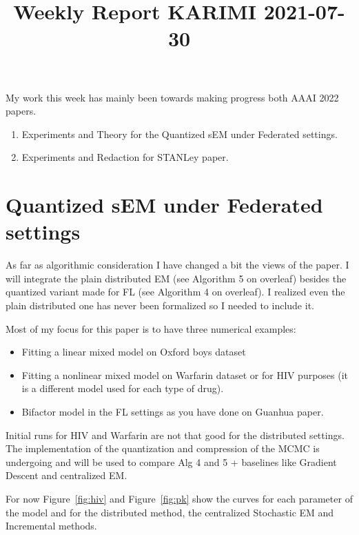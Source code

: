 \documentclass{article}
\begin{document}
\title{Weekly Report KARIMI 2021-07-30}


\date{}
\maketitle

\vspace{-0.5in}

My work this week has mainly been towards making progress both AAAI 2022 papers.
\begin{enumerate}
\item Experiments and Theory for the Quantized sEM under Federated settings.
\item Experiments and Redaction for STANLey paper.
\end{enumerate}


\section{Quantized sEM under Federated settings}
As far as algorithmic consideration I have changed a bit the views of the paper.
I will integrate the plain distributed EM (see Algorithm 5 on overleaf) besides the quantized variant made for FL (see Algorithm 4 on overleaf). I realized even the plain distributed one has never been formalized so I needed to include it.

Most of my focus for this paper is to have three numerical examples:
\begin{itemize}
\item Fitting a linear mixed model on Oxford boys dataset \citep{pinheiro2006mixed}
\item Fitting a nonlinear mixed model on Warfarin dataset \citep{international2009estimation} or for HIV purposes (it is a different model used for each type of drug).
\item Bifactor model in the FL settings as you have done on Guanhua paper.
\end{itemize}



Initial runs for HIV and Warfarin are not that good for the distributed settings.
The implementation of the quantization and compression of the MCMC is undergoing and will be used to compare Alg 4 and 5 + baselines like Gradient Descent and centralized EM.

For now Figure~\ref{fig:hiv} and Figure~\ref{fig:pk} show the curves for each parameter of the model and for the distributed method, the centralized Stochastic EM and Incremental methods.
\end{document}

